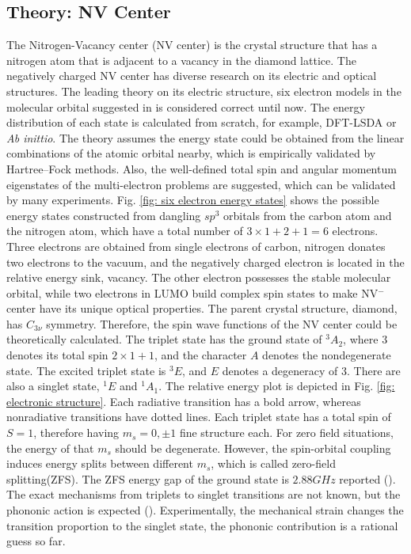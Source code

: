\documentclass{article}
\begin{document}
\subsection{Theory: NV Center}
\label{section: theory}
The Nitrogen-Vacancy center (NV center) is the crystal structure that has a nitrogen atom that is adjacent to a vacancy in the diamond lattice.
The negatively charged NV center has diverse research on its electric and optical structures.
The leading theory on its electric structure, six electron models in the molecular orbital suggested in \cite{sixelectron} is considered correct until now.
The energy distribution of each state is calculated from scratch, for example, DFT-LSDA or \textit{Ab inittio}.
The theory assumes the energy state could be obtained from the linear combinations of the atomic orbital nearby, which is empirically validated by Hartree–Fock methods.
Also, the well-defined total spin and angular momentum eigenstates of the multi-electron problems are suggested, which can be validated by many experiments.
Fig. \ref{fig: six electron energy states} shows the possible energy states constructed from dangling $sp^3$ orbitals from the carbon atom and the nitrogen atom, which have a total number of $3\times1 + 2 + 1 = 6$ electrons.
Three electrons are obtained from single electrons of carbon, nitrogen donates two electrons to the vacuum, and the negatively charged electron is located in the relative energy sink, vacancy.
The other electron possesses the stable molecular orbital, while two electrons in LUMO build complex spin states to make NV$^-$ center have its unique optical properties.
The parent crystal structure, diamond, has $C_{3\nu}$ symmetry.
Therefore, the spin wave functions of the NV center could be theoretically calculated.
The triplet state has the ground state of $ ^3A_2$, where $3$ denotes its total spin $2\times1+1$, and the character $A$ denotes the nondegenerate state.
The excited triplet state is $ ^3E$, and $E$ denotes a degeneracy of 3.
There are also a singlet state, $ ^1E$ and $ ^1A_1$.
The relative energy plot is depicted in Fig. \ref{fig: electronic structure}.
Each radiative transition has a bold arrow, whereas nonradiative transitions have dotted lines.
Each triplet state has a total spin of $S = 1$, therefore having $m_s = 0, \pm 1$ fine structure each.
For zero field situations, the energy of that $ m_s$ should be degenerate.
However, the spin-orbital coupling induces energy splits between different $m_s$, which is called zero-field splitting(ZFS).
The ZFS energy gap of the ground state is $2.88 GHz$ reported (\cite{nv}).
The exact mechanisms from triplets to singlet transitions are not known, but the phononic action is expected (\cite{nvphonon}).
Experimentally, the mechanical strain changes the transition proportion to the singlet state, the phononic contribution is a rational guess so far.
\end{document}
